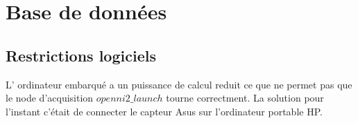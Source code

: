 \section{Base de données }

\begin{figure}[H]
\end{figure}

\begin{figure}[H]
\end{figure}

\begin{figure}[H]
\end{figure}

\begin{figure}[H]
\end{figure}


\subsection{Restrictions logiciels}
L' ordinateur embarqué a un puissance de calcul reduit ce que ne permet pas que le node d'acquisition \(openni2\_launch\) tourne correctment. La solution pour l'instant c'était de connecter le capteur Asus sur l'ordinateur portable HP.

